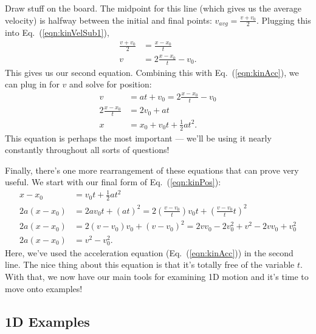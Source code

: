 \documentclass[letterpaper,12pt]{article}
\begin{document}
Draw stuff on the board. The midpoint for this line (which gives us the average velocity) is halfway between the initial and final points: $v_{avg} = \frac{v+v_0}{2}$. Plugging this into Eq.~(\ref{eqn:kinVelSub1}),
\begin{equation}\label{eqn:kinVel1}
\begin{split}
\frac{v+v_0}{2} &= \frac{x - x_0}{t}\\
v &= 2\frac{x - x_0}{t} - v_0.
\end{split}
\end{equation}
This gives us our second equation. Combining this with Eq.~(\ref{eqn:kinAcc}), we can plug in for $v$ and solve for position:
\begin{equation}\label{eqn:kinPos}
\begin{split}
v &= at + v_0 = 2\frac{x - x_0}{t} - v_0 \\
2\frac{x - x_0}{t} &= 2v_0 + at \\
x &= x_0 + v_0 t + \frac{1}{2}at^2.
\end{split}
\end{equation}
This equation is perhaps the most important --- we'll be using it nearly constantly throughout all sorts of questions!

Finally, there's one more rearrangement of these equations that can prove very useful. We start with our final form of Eq.~(\ref{eqn:kinPos}):
\begin{equation}\label{eqn:kinVel2}
\begin{split}
x - x_0 &= v_0 t + \frac{1}{2}at^2 \\
2a(x-x_0) &= 2av_0 t +(at)^2 = 2(\frac{v-v_0}{t})v_0 t +(\frac{v-v_0}{t}t)^2 \\
2a(x-x_0) &=  2(v-v_0)v_0 +(v-v_0)^2 = 2vv_0 -2v_0^2 +v^2 -2vv_0+v_0^2 \\
2a(x-x_0) &= v^2 - v_0^2.
\end{split}
\end{equation}
Here, we've used the acceleration equation (Eq.~(\ref{eqn:kinAcc})) in the second line. The nice thing about this equation is that it's totally free of the variable $t$. With that, we now have our main tools for examining 1D motion and it's time to move onto examples!

\subsection{1D Examples}\label{sec:1D examples}
\end{document}
